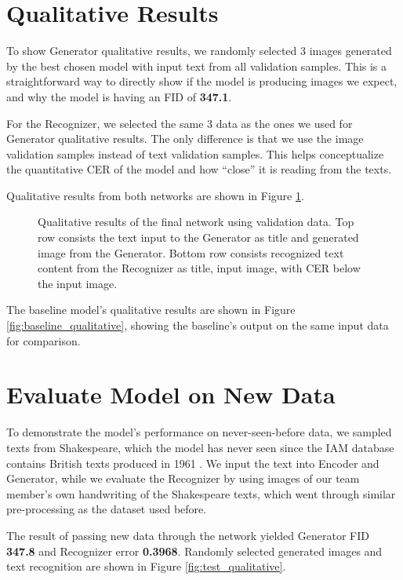 \documentclass{article} %
\begin{document}
\section{Qualitative Results}
To show Generator qualitative results, we randomly selected 3 images generated by the best chosen model with input text from all validation samples. This is a straightforward way to directly show if the model is producing images we expect, and why the model is having an FID of \textbf{347.1}.

For the Recognizer, we selected the same 3 data as the ones we used for Generator qualitative results. The only difference is that we use the image validation samples instead of text validation samples. This helps conceptualize the quantitative CER of the model and how ``close'' it is reading from the texts.

Qualitative results from both networks are shown in Figure \ref{fig:valid_qualitative}.

\begin{figure}[!hbpt]
    \begin{center}
        
    \end{center}
    \caption{Qualitative results of the final network using validation data. Top row consists the text input to the Generator as title and generated image from the Generator. Bottom row consists recognized text content from the Recognizer as title, input image, with CER below the input image.}
    \label{fig:valid_qualitative}
\end{figure}

The baseline model's qualitative results are shown in Figure \ref{fig:baseline_qualitative}, showing the baseline's output on the same input data for comparison.

\section{Evaluate Model on New Data}
To demonstrate the model's performance on never-seen-before data, we sampled texts from Shakespeare, which the model has never seen since the IAM database contains British texts produced in 1961 \citep{Marti1999AFE} \citep{corpus}. We input the text into Encoder and Generator, while we evaluate the Recognizer by using images of our team member's own handwriting of the Shakespeare texts, which went through similar pre-processing as the dataset used before.

The result of passing new data through the network yielded Generator FID \textbf{347.8} and Recognizer error \textbf{0.3968}. Randomly selected generated images and text recognition are shown in Figure \ref{fig:test_qualitative}.
\end{document}
